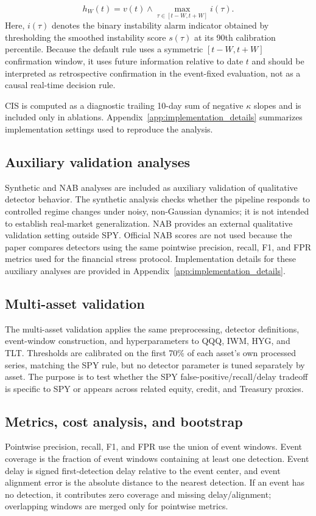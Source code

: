 \documentclass[10pt,twocolumn]{article}
\begin{document}
\begin{itemize}
\begin{equation}
h_W(t)=v(t)\wedge \max_{\tau\in[t-W,t+W]}i(\tau).
\end{equation}
Here, $i(\tau)$ denotes the binary instability alarm indicator obtained by thresholding the smoothed instability score $s(\tau)$ at its 90th calibration percentile. Because the default rule uses a symmetric $[t-W,t+W]$ confirmation window, it uses future information relative to date $t$ and should be interpreted as retrospective confirmation in the event-fixed evaluation, not as a causal real-time decision rule.
\end{itemize}
CIS is computed as a diagnostic trailing 10-day sum of negative $\kappa$ slopes and is included only in ablations. Appendix~\ref{app:implementation_details} summarizes implementation settings used to reproduce the analysis.

\subsection{Auxiliary validation analyses}
Synthetic and NAB analyses are included as auxiliary validation of qualitative detector behavior. The synthetic analysis checks whether the pipeline responds to controlled regime changes under noisy, non-Gaussian dynamics; it is not intended to establish real-market generalization. NAB provides an external qualitative validation setting outside SPY. Official NAB scores are not used because the paper compares detectors using the same pointwise precision, recall, F1, and FPR metrics used for the financial stress protocol. Implementation details for these auxiliary analyses are provided in Appendix~\ref{app:implementation_details}.

\subsection{Multi-asset validation}
The multi-asset validation applies the same preprocessing, detector definitions, event-window construction, and hyperparameters to QQQ, IWM, HYG, and TLT. Thresholds are calibrated on the first 70\% of each asset's own processed series, matching the SPY rule, but no detector parameter is tuned separately by asset. The purpose is to test whether the SPY false-positive/recall/delay tradeoff is specific to SPY or appears across related equity, credit, and Treasury proxies.

\subsection{Metrics, cost analysis, and bootstrap}
Pointwise precision, recall, F1, and FPR use the union of event windows. Event coverage is the fraction of event windows containing at least one detection. Event delay is signed first-detection delay relative to the event center, and event alignment error is the absolute distance to the nearest detection. If an event has no detection, it contributes zero coverage and missing delay/alignment; overlapping windows are merged only for pointwise metrics.
\end{document}

